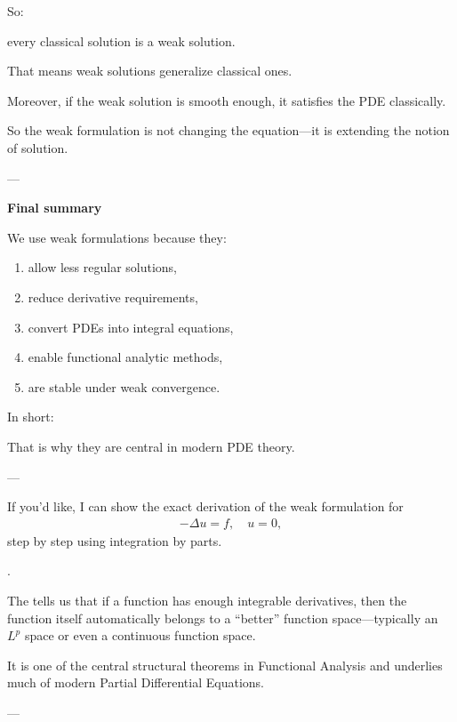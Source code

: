 \documentclass[12pt,a4paper]{report}
\begin{document}
\begin{description}
\begin{description}
So:

\> every classical solution is a weak solution.

That means weak solutions generalize classical ones.

Moreover, if the weak solution is smooth enough, it satisfies the PDE classically.

So the weak formulation is not changing the equation—it is extending the notion of solution.

---

\item \textbf{Final summary}

We use weak formulations because they:
\begin{enumerate}
\item allow less regular solutions,
\item reduce derivative requirements,
\item convert PDEs into integral equations,
\item enable functional analytic methods,
\item are stable under weak convergence.
\end{enumerate}

In short:

\> 

That is why they are central in modern PDE theory.

---
\end{description}

If you'd like, I can show the exact derivation of the weak formulation for
\begin{align*}
-\Delta u=f,\quad u=0,
\end{align*}
step by step using integration by parts.

\newpage
	\item {}.

The  tells us that if a function has enough integrable derivatives, then the function itself automatically belongs to a “better” function space—typically an $L^p$ space or even a continuous function space.

It is one of the central structural theorems in Functional Analysis and underlies much of modern Partial Differential Equations.

---
\begin{description}


\end{description}
\end{description}
\end{document}
